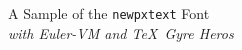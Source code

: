 \documentclass[11pt]{article}
\begin{document}
{\LARGE \noindent A Sample of the \texttt{newpxtext} Font}\\

{\large \noindent \textit{with Euler-VM and \TeX\ Gyre Heros}}\\[5pt]


\end{document}
